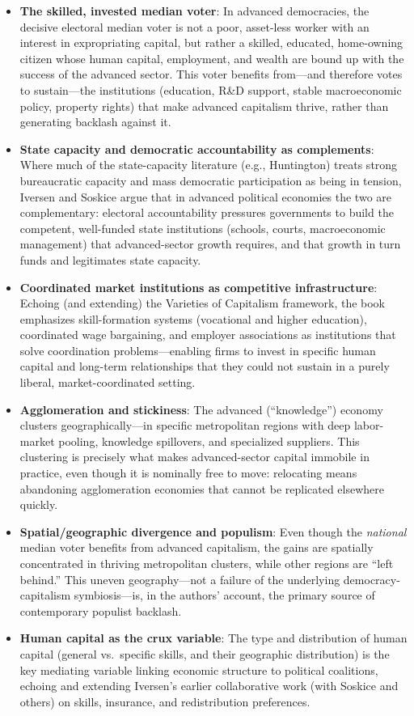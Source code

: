 \documentclass[12pt]{article}
\begin{document}
\begin{itemize}[leftmargin=*, itemsep=4pt]
    \item \textbf{The skilled, invested median voter}: In advanced democracies, the decisive electoral median voter is not a poor, asset-less worker with an interest in expropriating capital, but rather a skilled, educated, home-owning citizen whose human capital, employment, and wealth are bound up with the success of the advanced sector. This voter benefits from---and therefore votes to sustain---the institutions (education, R\&D support, stable macroeconomic policy, property rights) that make advanced capitalism thrive, rather than generating backlash against it.
    \item \textbf{State capacity and democratic accountability as complements}: Where much of the state-capacity literature (e.g., Huntington) treats strong bureaucratic capacity and mass democratic participation as being in tension, Iversen and Soskice argue that in advanced political economies the two are complementary: electoral accountability pressures governments to build the competent, well-funded state institutions (schools, courts, macroeconomic management) that advanced-sector growth requires, and that growth in turn funds and legitimates state capacity.
    \item \textbf{Coordinated market institutions as competitive infrastructure}: Echoing (and extending) the Varieties of Capitalism framework, the book emphasizes skill-formation systems (vocational and higher education), coordinated wage bargaining, and employer associations as institutions that solve coordination problems---enabling firms to invest in specific human capital and long-term relationships that they could not sustain in a purely liberal, market-coordinated setting.
    \item \textbf{Agglomeration and stickiness}: The advanced (``knowledge'') economy clusters geographically---in specific metropolitan regions with deep labor-market pooling, knowledge spillovers, and specialized suppliers. This clustering is precisely what makes advanced-sector capital immobile in practice, even though it is nominally free to move: relocating means abandoning agglomeration economies that cannot be replicated elsewhere quickly.
    \item \textbf{Spatial/geographic divergence and populism}: Even though the \textit{national} median voter benefits from advanced capitalism, the gains are spatially concentrated in thriving metropolitan clusters, while other regions are ``left behind.'' This uneven geography---not a failure of the underlying democracy-capitalism symbiosis---is, in the authors' account, the primary source of contemporary populist backlash.
    \item \textbf{Human capital as the crux variable}: The type and distribution of human capital (general vs.\ specific skills, and their geographic distribution) is the key mediating variable linking economic structure to political coalitions, echoing and extending Iversen's earlier collaborative work (with Soskice and others) on skills, insurance, and redistribution preferences.
\end{itemize}
\end{document}
